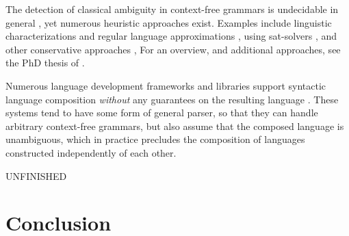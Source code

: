 \documentclass[acmsmall,review,anonymous]{acmart}\settopmatter{printfolios=true,printccs=false,printacmref=false}
\begin{document}
The detection of classical ambiguity in context-free grammars is undecidable in general \cite{cantorAmbiguityProblemBackus1962}, yet numerous heuristic approaches exist. Examples include linguistic characterizations and regular language approximations \cite{brabrandAnalyzingAmbiguityContextFree2007}, using sat-solvers \cite{axelssonAnalyzingContextFreeGrammars2008}, and other conservative approaches \cite{schmitzConservativeAmbiguityDetection2007}, For an overview, and additional approaches, see the PhD thesis of \citet{bastenAmbiguityDetectionProgramming2011}.

Numerous language development frameworks and libraries support syntactic language composition \emph{without} any guarantees on the resulting language \cite{heeringSyntaxDefinitionFormalism1989}. These systems tend to have some form of general parser, so that they can handle arbitrary context-free grammars, but also assume that the composed language is unambiguous, which in practice precludes the composition of languages constructed independently of each other.

UNFINISHED

\section{Conclusion}








\end{document}

